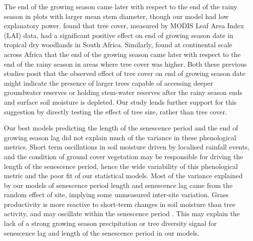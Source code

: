 \documentclass[11pt,a4paper]{article}
\begin{document}
The end of the growing season came later with respect to the end of the rainy season in plots with larger mean stem diameter, though our model had low
explanatory power. \citet{Cho2017} found that tree cover, measured by MODIS
Leaf Area Index (LAI) data, had a significant positive effect on end of growing
season date in tropical dry woodlands in South Africa. Similarly,
\citet{Guan2014} found at continental scale across Africa that the end of the
growing season came later with respect to the end of the rainy season in areas
where tree cover was higher. Both these previous studies posit that the
observed effect of tree cover on end of growing season date might indicate the
presence of larger trees capable of accessing deeper groundwater reserves or
holding stem-water reserves after the rainy season ends and surface soil
moisture is depleted. Our study lends further support for this suggestion
by directly testing the effect of tree size, rather than tree cover. 

Our best models predicting the length of the senescence period and the end of
growing season lag did not explain much of the variance in these phenological
metrics. Short term oscillations in soil moisture driven by localised rainfall
events, and the condition of ground cover vegetation may be responsible for
driving the length of the senescence period, hence the wide variability of this
phenological metric and the poor fit of our statistical models. Most of the
variance explained by our models of senescence period length and senescence lag
came from the random effect of site, implying some unmeasured inter-site
variation. Grass productivity is more reactive to short-term changes in soil
moisture than tree activity, and may oscillate within the senescence period
\citep{Archibald2007}. This may explain the lack of a strong growing season
precipitation or tree diversity signal for senescence lag and length of the
senescence period in our models.
\end{document}
